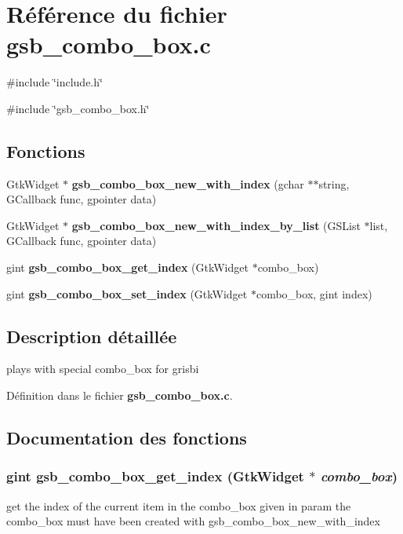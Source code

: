 \section{Référence du fichier gsb\_\-combo\_\-box.c}
\label{gsb__combo__box_8c}
{\ttfamily \#include \char`\"{}include.h\char`\"{}}\par
{\ttfamily \#include \char`\"{}gsb\_\-combo\_\-box.h\char`\"{}}\par
\subsection*{Fonctions}
\begin{DoxyCompactItemize}
\item 
GtkWidget $\ast$ {\bf gsb\_\-combo\_\-box\_\-new\_\-with\_\-index} (gchar $\ast$$\ast$string, GCallback func, gpointer data)
\item 
GtkWidget $\ast$ {\bf gsb\_\-combo\_\-box\_\-new\_\-with\_\-index\_\-by\_\-list} (GSList $\ast$list, GCallback func, gpointer data)
\item 
gint {\bf gsb\_\-combo\_\-box\_\-get\_\-index} (GtkWidget $\ast$combo\_\-box)
\item 
gint {\bf gsb\_\-combo\_\-box\_\-set\_\-index} (GtkWidget $\ast$combo\_\-box, gint index)
\end{DoxyCompactItemize}


\subsection{Description détaillée}
plays with special combo\_\-box for grisbi 

Définition dans le fichier {\bf gsb\_\-combo\_\-box.c}.



\subsection{Documentation des fonctions}
\subsubsection[{gsb\_\-combo\_\-box\_\-get\_\-index}]{\setlength{\rightskip}{0pt plus 5cm}gint gsb\_\-combo\_\-box\_\-get\_\-index (GtkWidget $\ast$ {\em combo\_\-box})}\label{gsb__combo__box_8c_a12d7d2e0baa0791bf2e5740c43376153}
get the index of the current item in the combo\_\-box given in param the combo\_\-box must have been created with gsb\_\-combo\_\-box\_\-new\_\-with\_\-index


